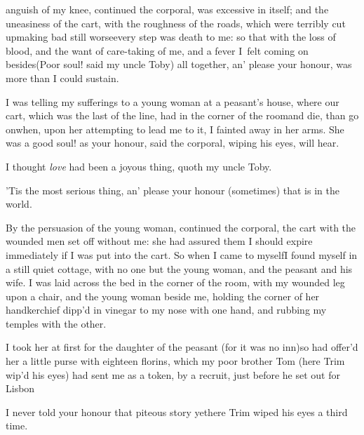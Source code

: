\documentclass{article}
\begin{document}
 anguish of my knee, continued the
corporal, was excessive in itself; and the uneasiness of the
cart, with the roughness of the roads, which were terribly cut
up\tsk making bad still worse\tsk every step was death to me: so
that with the loss of blood, and the want of care-taking of
me, and a fever I~felt coming on besides\tsh (Poor soul!\break
said my uncle Toby) all together, an’ please your honour, was
more than I could sustain.

I was telling my sufferings to a young woman at
a peasant’s house, where our cart, which was the
last of the line, had 
in the corner of the room\tsk and die,
than go on\tsh when, upon her attempting to lead
me to it, I fainted away in her arms. She was a
good soul! as your honour, said the corporal,
wiping his eyes, will hear.

I thought \textit{love} had been a joyous thing, quoth my uncle
Toby.

’Tis the most serious thing, an’ please your honour
(sometimes) that is in the world.

By the persuasion of the young woman, continued the corporal,
the cart with the wounded men set off without me: she had assured
them I should expire immediately if I was put into the cart. So
when I came to myself\tsh I found myself in a still quiet
cottage, with no one but the young woman, and the peasant and his
wife. I was laid across the bed in the corner of the room, with my
wounded leg upon a chair, and the young woman beside me, holding
the corner of her handkerchief dipp’d in vinegar to my nose
with one hand, and rubbing my temples with the other.

I took her at first for the daughter of the peasant (for it was
no inn)\tsk so had offer’d her a little purse with eighteen
florins, which my poor brother Tom (here Trim
wip’d his eyes) had sent me as a token, by a recruit, just before he set out for
Lisbon\tsh

\tsh I never told your honour that piteous story
yet\tsh here Trim wiped his eyes a third time.
\end{document}

